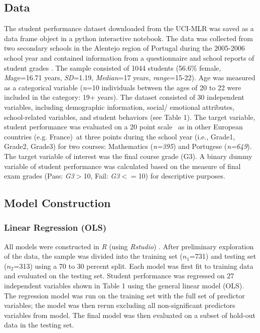 \documentclass[sigconf]{acmart}
\begin{document}
\subsection{Data}

The student performance dataset downloaded from the UCI-MLR was saved as a 
data frame object in a python interactive notebook. The data was collected 
from two secondary schools in the Alentejo region of Portugal during the 
2005-2006 school year and contained information from a questionnaire and 
school reports of student grades \cite{cortez08}. The sample consisted of 
1044 students (56.6\% female, \textit{M}age=16.71 years, \textit{SD}=1.19,
\textit{Median}=17 years, \textit{range}=15-22). Age was measured as a 
categorical variable (\textit{n}=10 individuals between the ages of 20 to 22 
were included in the category: 19+ years). The dataset consisted of 30 
independent variables, including demographic information, social/ emotional
attributes, school-related variables, and student behaviors (see Table 1). 
The target variable, student performance was evaluated on a 20 point scale
\-\ as in other European countries (e.g. France)\-\ at three points during 
the school year (i.e., Grade1, Grade2, Grade3) for two courses: Mathematics
(\textit{n=395}) and Portugese (\textit{n=649}). The target variable of 
interest was the final course grade (G3). A binary dummy variable of
student performance was calculated based on the measure of final exam grades 
(Pass: \textit{G3}$>$10, Fail: \textit{G3}$<=$10) for descriptive purposes.


\subsection{Model Construction}

\subsubsection{Linear Regression (OLS)} 

All models were constructed in \textit{R} (using \textit{Rstudio})
\cite{jamesetal13}. After preliminary exploration of the data, the sample 
was divided into the training set ($n_1$=731) and testing set ($n_2$=313) 
using a 70 to 30 percent split. Each model was first fit to training data 
and evaluated on the testing set. Student performance was regressed on 
27 independent variables shown in Table 1 using the general linear model 
(OLS). The regression model was run on the training set with the full 
set of predictor variables; the model was then rerun excluding all 
non-significant predictors variables from model. The final model was then 
evaluated on a subset of hold-out data in the testing set. 
\end{document}

